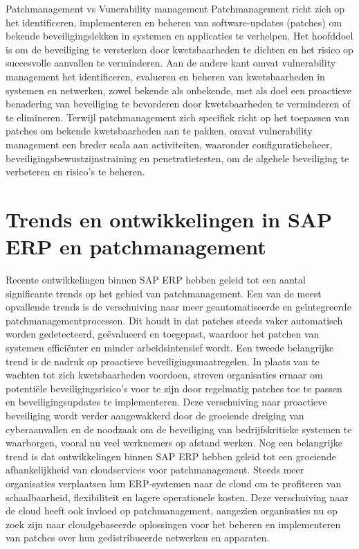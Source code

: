 Patchmanagement vs Vunerability management
Patchmanagement richt zich op het identificeren, implementeren en beheren van software-updates (patches) om bekende beveiligingslekken in systemen en applicaties te verhelpen. Het hoofddoel is om de beveiliging te versterken door kwetsbaarheden te dichten en het risico op succesvolle aanvallen te verminderen. Aan de andere kant omvat vulnerability management het identificeren, evalueren en beheren van kwetsbaarheden in systemen en netwerken, zowel bekende als onbekende, met als doel een proactieve benadering van beveiliging te bevorderen door kwetsbaarheden te verminderen of te elimineren. Terwijl patchmanagement zich specifiek richt op het toepassen van patches om bekende kwetsbaarheden aan te pakken, omvat vulnerability management een breder scala aan activiteiten, waaronder configuratiebeheer, beveiligingsbewustzijnstraining en penetratietesten, om de algehele beveiliging te verbeteren en risico's te beheren. \autocite{Danby2023}

\section{Trends en ontwikkelingen in SAP ERP en patchmanagement}
Recente ontwikkelingen binnen SAP ERP hebben geleid tot een aantal significante trends op het gebied van patchmanagement. Een van de meest opvallende trends is de verschuiving naar meer geautomatiseerde en geïntegreerde patchmanagementprocessen. Dit houdt in dat patches steeds vaker automatisch worden gedetecteerd, geëvalueerd en toegepast, waardoor het patchen van systemen efficiënter en minder arbeidsintensief wordt. 
Een tweede belangrijke trend is de nadruk op proactieve beveiligingsmaatregelen. In plaats van te wachten tot zich kwetsbaarheden voordoen, streven organisaties ernaar om potentiële beveiligingsrisico's voor te zijn door regelmatig patches toe te passen en beveiligingsupdates te implementeren. Deze verschuiving naar proactieve beveiliging wordt verder aangewakkerd door de groeiende dreiging van cyberaanvallen en de noodzaak om de beveiliging van bedrijfskritieke systemen te waarborgen, vooral nu veel werknemers op afstand werken. 
Nog een belangrijke trend is dat ontwikkelingen binnen SAP ERP hebben geleid tot een groeiende afhankelijkheid van cloudservices voor patchmanagement. Steeds meer organisaties verplaatsen hun ERP-systemen naar de cloud om te profiteren van schaalbaarheid, flexibiliteit en lagere operationele kosten. Deze verschuiving naar de cloud heeft ook invloed op patchmanagement, aangezien organisaties nu op zoek zijn naar cloudgebaseerde oplossingen voor het beheren en implementeren van patches over hun gedistribueerde netwerken en apparaten. \autocite{Kannan2023}

